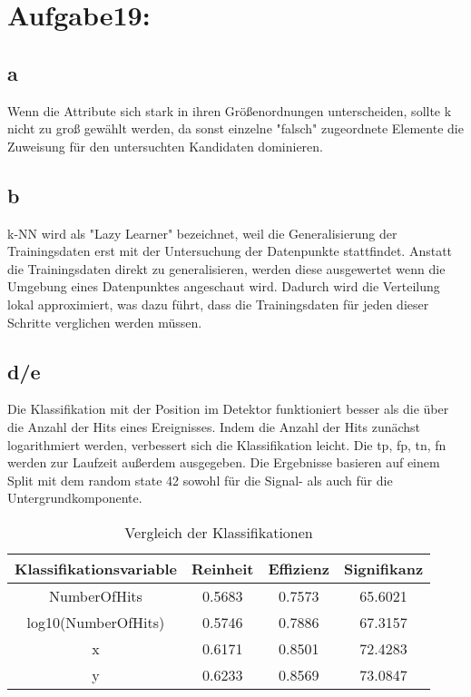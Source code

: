\section{Aufgabe19:}
\subsection{a}
Wenn die Attribute sich stark in ihren Größenordnungen unterscheiden,
sollte k nicht zu groß gewählt werden, da sonst einzelne 
"falsch" zugeordnete Elemente die Zuweisung für den untersuchten Kandidaten dominieren.

\subsection{b}
k-NN wird als "Lazy Learner" bezeichnet, weil die Generalisierung der 
Trainingsdaten erst mit der Untersuchung der Datenpunkte stattfindet.
Anstatt die Trainingsdaten direkt zu generalisieren, werden diese 
ausgewertet wenn die Umgebung eines Datenpunktes angeschaut wird.
Dadurch wird die Verteilung lokal approximiert, was 
dazu führt, dass die Trainingsdaten für jeden dieser Schritte 
verglichen werden müssen. 

\subsection{d/e}

Die Klassifikation mit der Position im Detektor funktioniert besser als 
die über die Anzahl der Hits eines Ereignisses. 
Indem die Anzahl der Hits zunächst logarithmiert werden, verbessert
sich die Klassifikation leicht. 
Die tp, fp, tn, fn werden zur Laufzeit außerdem ausgegeben.
Die Ergebnisse basieren auf einem Split mit dem random state 42
sowohl für die Signal- als auch für die Untergrundkomponente.
\begin{table}
\centering
\caption{Vergleich der Klassifikationen}
\begin{tabular}{c | c c c} \toprule
  Klassifikationsvariable& Reinheit&
  Effizienz& Signifikanz\\
  \midrule
NumberOfHits & 0.5683& 0.7573 & 65.6021\\
log10(NumberOfHits) & 0.5746& 0.7886 & 67.3157\\
x & 0.6171& 0.8501 & 72.4283\\
y & 0.6233& 0.8569 & 73.0847\\
   \bottomrule
 \end{tabular}
\end{table}

